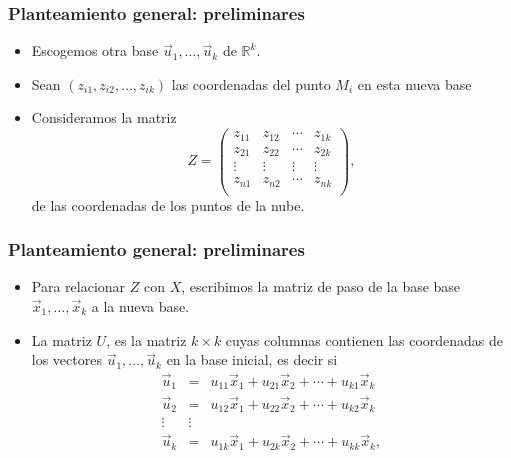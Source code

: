 \documentclass{beamer}
\newcommand{\field}[1]{\mathbb{#1}}
\newcommand{\R}{\field{R}}
\begin{document}
    \begin{frame}\frametitle{Planteamiento general: preliminares}
    \begin{itemize}
    \item<+-> Escogemos otra base $\vec{u}_1,\ldots,\vec{u}_k$ de $\R^k$.
    \item<+-> Sean $(z_{i1},z_{i2},\ldots,z_{ik})$  las coordenadas del punto $M_i$ en esta nueva base
        \item<+-> Consideramos la matriz
          $$Z=\left(\begin{array}{llll}
z_{11}&z_{12}&\cdots&z_{1k}\\
z_{21}&z_{22}&\cdots&z_{2k}\\
\vdots&\vdots&\vdots&\vdots\\
z_{n1}&z_{n2}&\cdots&z_{nk}\\
\end{array}\right),$$
de las coordenadas de los puntos de la nube.
    \end{itemize}
    
 \end{frame}
      \begin{frame}\frametitle{Planteamiento general: preliminares}
    \begin{itemize}
    \item<+-> Para relacionar $Z$ con $X$, escribimos la matriz de paso de la base base $\vec{x}_1,\ldots,\vec{x}_k$ a la nueva base.
    \item<+-> La matriz $U$, es la matriz $k\times k$ cuyas columnas contienen las coordenadas de los vectores $\vec{u}_1,\ldots,\vec{u}_k$ en la base inicial, es decir si
\begin{eqnarray*}
\vec{u}_1&=&u_{11}\vec{x}_1+u_{21}\vec{x}_2+\cdots+u_{k1}\vec{x}_k\\
\vec{u}_2&=&u_{12}\vec{x}_1+u_{22}\vec{x}_2+\cdots+u_{k2}\vec{x}_k\\
\vdots&\vdots\\
\vec{u}_k&=&u_{1k}\vec{x}_1+u_{2k}\vec{x}_2+\cdots+u_{kk}\vec{x}_k,\\
\end{eqnarray*}    \end{itemize}
    
 \end{frame}
\end{document}
